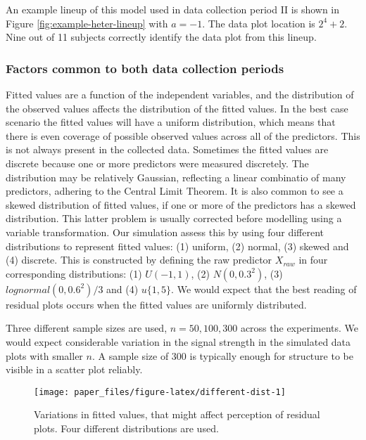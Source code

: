\documentclass[]{interact}
\theoremstyle{plain}%
\theoremstyle{definition}
\theoremstyle{remark}
\begin{document}
An example lineup of this model used in data collection period II is
shown in Figure \ref{fig:example-heter-lineup} with \(a = -1\). The data
plot location is \(2^4 + 2\). Nine out of 11 subjects correctly identify
the data plot from this lineup.

\hypertarget{factors-common-to-both-data-collection-periods}{%
\subsubsection{Factors common to both data collection
periods}\label{factors-common-to-both-data-collection-periods}}

Fitted values are a function of the independent variables, and the
distribution of the observed values affects the distribution of the
fitted values. In the best case scenario the fitted values will have a
uniform distribution, which means that there is even coverage of
possible observed values across all of the predictors. This is not
always present in the collected data. Sometimes the fitted values are
discrete because one or more predictors were measured discretely. The
distribution may be relatively Gaussian, reflecting a linear combinatio
of many predictors, adhering to the Central Limit Theorem. It is also
common to see a skewed distribution of fitted values, if one or more of
the predictors has a skewed distribution. This latter problem is usually
corrected before modelling using a variable transformation. Our
simulation assess this by using four different distributions to
represent fitted values: (1) uniform, (2) normal, (3) skewed and (4)
discrete. This is constructed by defining the raw predictor \(X_{raw}\)
in four corresponding distributions: (1) \(U(-1, 1)\), (2)
\(N(0, 0.3^2)\), (3) \(lognormal(0, 0.6^2)/3\) and (4) \(u\{1, 5\}\). We
would expect that the best reading of residual plots occurs when the
fitted values are uniformly distributed.

Three different sample sizes are used, \(n = 50, 100, 300\) across the
experiments. We would expect considerable variation in the signal
strength in the simulated data plots with smaller \(n\). A sample size
of 300 is typically enough for structure to be visible in a scatter plot
reliably.

\begin{figure}

{\centering \texttt{[image: paper\_files/figure-latex/different-dist-1]} 

}

\caption{Variations in fitted values, that might affect perception of residual plots. Four different distributions are used.}\label{fig:different-dist}
\end{figure}
\end{document}
